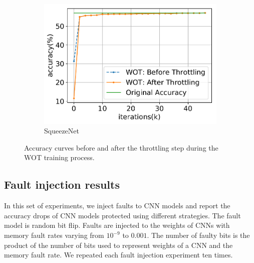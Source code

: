 \documentclass{article}
\begin{document}
\begin{figure}[t]
\begin{subfigure}{.32\textwidth}
    \includegraphics[width=\textwidth]{NeuRIPS2019/images/WOT_new/squeezenet1_0_accuracy.pdf}
    \caption{SqueezeNet}
  \end{subfigure}
  \vspace{-0.08in}
  \caption{Accuracy curves before and after the throttling step during the WOT training process.}
  \label{fig:wot_accuracy}
\vspace{-0.1in}
\end{figure}

\subsection{Fault injection results}
\label{sec:fault_injection_results}

In this set of experiments, we inject faults to CNN models and report the accuracy drops of CNN models protected using different strategies. The fault model is random bit flip. Faults are injected to the weights of CNNs with memory fault rates varying from $10^{-9}$ to $0.001$. The number of faulty bits is the product of the number of bits used to represent weights of a CNN and the memory fault rate. We repeated each fault injection experiment ten times.

\end{document}
